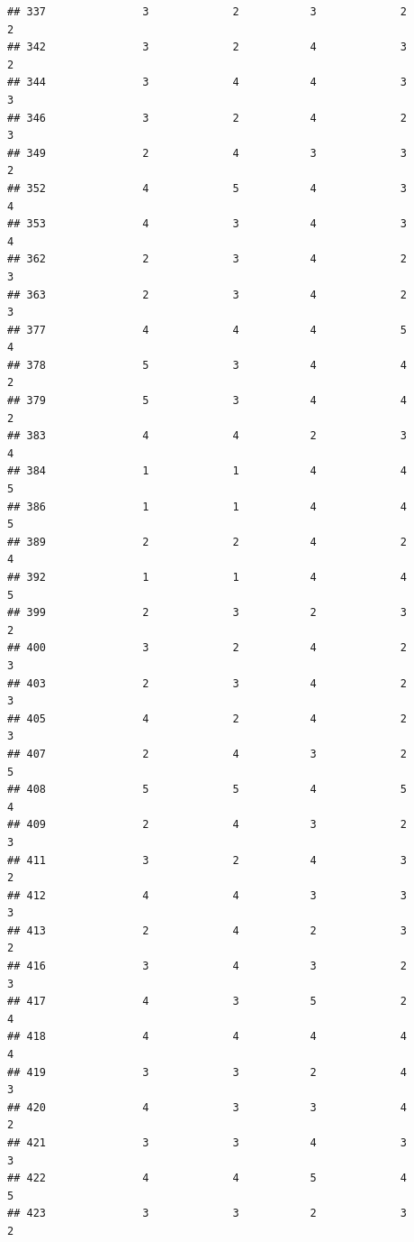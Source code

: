 \documentclass[
]{article}
\begin{document}
\begin{verbatim}
## 337               3             2           3             2            2
## 342               3             2           4             3            2
## 344               3             4           4             3            3
## 346               3             2           4             2            3
## 349               2             4           3             3            2
## 352               4             5           4             3            4
## 353               4             3           4             3            4
## 362               2             3           4             2            3
## 363               2             3           4             2            3
## 377               4             4           4             5            4
## 378               5             3           4             4            2
## 379               5             3           4             4            2
## 383               4             4           2             3            4
## 384               1             1           4             4            5
## 386               1             1           4             4            5
## 389               2             2           4             2            4
## 392               1             1           4             4            5
## 399               2             3           2             3            2
## 400               3             2           4             2            3
## 403               2             3           4             2            3
## 405               4             2           4             2            3
## 407               2             4           3             2            5
## 408               5             5           4             5            4
## 409               2             4           3             2            3
## 411               3             2           4             3            2
## 412               4             4           3             3            3
## 413               2             4           2             3            2
## 416               3             4           3             2            3
## 417               4             3           5             2            4
## 418               4             4           4             4            4
## 419               3             3           2             4            3
## 420               4             3           3             4            2
## 421               3             3           4             3            3
## 422               4             4           5             4            5
## 423               3             3           2             3            2

\end{verbatim}
\end{document}
